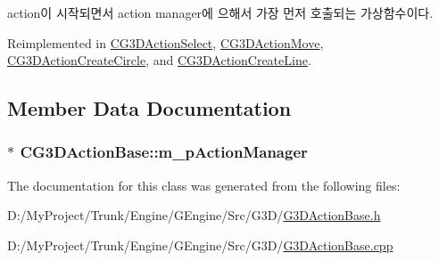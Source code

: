 \begin{DoxyItemize}
\item action이 시작되면서 action manager에 으해서 가장 먼저 호출되는 가상함수이다. 
\end{DoxyItemize}

Reimplemented in \hyperlink{class_c_g3_d_action_select_a45e05f0516abe52906246744a548f003}{C\+G3\+D\+Action\+Select}, \hyperlink{class_c_g3_d_action_move_a0f8a21c7c120a78f827895f16ab412e0}{C\+G3\+D\+Action\+Move}, \hyperlink{class_c_g3_d_action_create_circle_ab4ea578c57427132c3e3180fa9859ec0}{C\+G3\+D\+Action\+Create\+Circle}, and \hyperlink{class_c_g3_d_action_create_line_a35ac8fd2cabe6090a6853c38975deeec}{C\+G3\+D\+Action\+Create\+Line}.



\subsection{Member Data Documentation}
\hypertarget{class_c_g3_d_action_base_a39cdc8513129f06a4ac45e9b56ce499c}{}
\subsubsection[{m\+\_\+p\+Action\+Manager}]{$\ast$ C\+G3\+D\+Action\+Base\+::m\+\_\+p\+Action\+Manager\hspace{0.3cm}{\ttfamily [protected]}}\label{class_c_g3_d_action_base_a39cdc8513129f06a4ac45e9b56ce499c}


The documentation for this class was generated from the following files\+:\begin{DoxyCompactItemize}
\item 
D\+:/\+My\+Project/\+Trunk/\+Engine/\+G\+Engine/\+Src/\+G3\+D/\hyperlink{_g3_d_action_base_8h}{G3\+D\+Action\+Base.\+h}\item 
D\+:/\+My\+Project/\+Trunk/\+Engine/\+G\+Engine/\+Src/\+G3\+D/\hyperlink{_g3_d_action_base_8cpp}{G3\+D\+Action\+Base.\+cpp}\end{DoxyCompactItemize}
